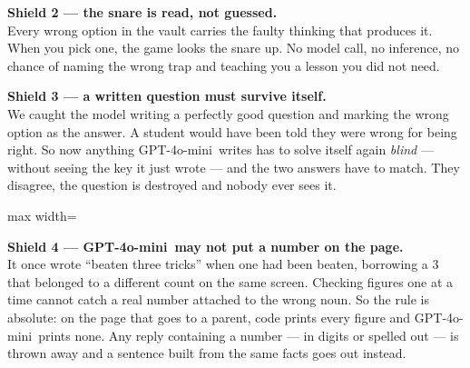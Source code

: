 \documentclass[11pt]{article}
\newcommand{\themodel}{GPT-4o-mini}
\begin{document}
\begin{shieldbox}
\textbf{Shield 2 --- the snare is read, not guessed.}\\
Every wrong option in the vault carries the faulty thinking that produces it.
When you pick one, the game looks the snare up. No model call, no inference, no
chance of naming the wrong trap and teaching you a lesson you did not need.
\end{shieldbox}

\begin{shieldbox}
\textbf{Shield 3 --- a written question must survive itself.}\\
We caught the model writing a perfectly good question and marking the wrong
option as the answer. A student would have been told they were wrong for being
right. So now anything \themodel\ writes has to solve itself again \emph{blind}
--- without seeing the key it just wrote --- and the two answers have to match.
They disagree, the question is destroyed and nobody ever sees it.
\end{shieldbox}

\vspace{0.4em}
\begin{center}
\begin{adjustbox}{max width=\textwidth}
\end{adjustbox}
\end{center}

\begin{shieldbox}
\textbf{Shield 4 --- \themodel\ may not put a number on the page.}\\
It once wrote ``beaten three tricks'' when one had been beaten, borrowing a 3
that belonged to a different count on the same screen. Checking figures one at
a time cannot catch a real number attached to the wrong noun. So the rule is
absolute: on the page that goes to a parent, code prints every figure and
\themodel\ prints none. Any reply containing a number --- in digits or spelled
out --- is thrown away and a sentence built from the same facts goes out
instead.
\end{shieldbox}
\end{document}
